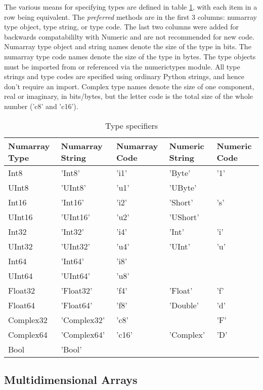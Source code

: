 The various means for specifying types are defined in table
\ref{tab:type-specifiers}, with each item in a row being equivalent.  The
\emph{preferred} methods are in the first 3 columns: numarray type object, type
string, or type code.  The last two columns were added for backwards
compatabililty with Numeric and are not recommended for new code.  Numarray
type object and string names denote the size of the type in bits.  The numarray
type code names denote the size of the type in bytes.  The type objects must be
imported from or referenced via the numerictypes module.  All type strings and
type codes are specified using ordinary Python strings, and hence don't require
an import.  Complex type names denote the size of one component, real or
imaginary, in bits/bytes, but the letter code is the total size of the 
whole number ('c8' and 'c16').

\begin{table}[h]
  \centering
  \caption{Type specifiers}
  \label{tab:type-specifiers}
  \begin{tabular}{|l|l|l|l|l|}
    \hline
    Numarray Type&Numarray String&Numarray Code&Numeric String&Numeric Code\\
    \hline
    Int8&'Int8'&'i1'&'Byte'&'1'\\
    \hline
    UInt8&'UInt8'&'u1'&'UByte'& \\
    \hline
    Int16&'Int16'&'i2'&'Short'&'s'\\
    \hline
    UInt16&'UInt16'&'u2'&'UShort'& \\
    \hline
    Int32&'Int32'&'i4'&'Int'&'i'\\
    \hline
    UInt32&'UInt32'&'u4'&'UInt'&'u'\\
    \hline
    Int64&'Int64'&'i8'& & \\
    \hline
    UInt64\footnotemark[1]&'UInt64'&'u8'& & \\
    \hline
    Float32&'Float32'&'f4'&'Float'&'f'\\
    \hline
    Float64&'Float64'&'f8'&'Double'&'d'\\
    \hline
    Complex32&'Complex32'&'c8'& &'F'\\
    \hline
    Complex64&'Complex64'&'c16'&'Complex'&'D'\\
    \hline
    Bool&'Bool'& & & \\
    \hline
  \end{tabular}
\end{table}

\subsection{Multidimensional Arrays}
\label{sec:multi-dim-arrays}

